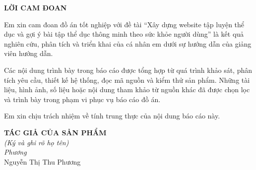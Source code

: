 \thispagestyle{plain}

\noindent
\begin{center}
\textbf{\fontsize{16pt}{18pt}\selectfont LỜI CAM ĐOAN}
\end{center}

\vspace{0.25cm}
Em xin cam đoan đồ án tốt nghiệp với đề tài “Xây dựng website tập luyện thể dục và gợi ý bài tập thể dục thông minh theo sức khỏe người dùng” là kết quả nghiên cứu, phân tích và triển khai của cá nhân em dưới sự hướng dẫn của giảng viên hướng dẫn.

Các nội dung trình bày trong báo cáo được tổng hợp từ quá trình khảo sát, phân tích yêu cầu, thiết kế hệ thống, đọc mã nguồn và kiểm thử sản phẩm. Những tài liệu, hình ảnh, số liệu hoặc nội dung tham khảo từ nguồn khác đã được chọn lọc và trình bày trong phạm vi phục vụ báo cáo đồ án.

Em xin chịu trách nhiệm về tính trung thực của nội dung báo cáo này.

\vspace{1.05cm}
\begin{flushright}
\begin{minipage}{0.42\textwidth}
\centering
\textbf{TÁC GIẢ CỦA SẢN PHẨM}\\
\textit{(Ký và ghi rõ họ tên)}\\[1.05cm]
\textit{Phương}\\[0.25cm]
Nguyễn Thị Thu Phương
\end{minipage}
\end{flushright}
